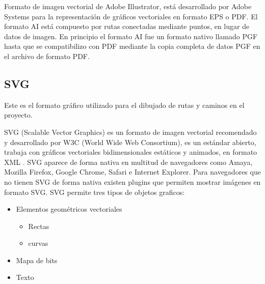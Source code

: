 Formato de imagen vectorial de Adobe Illustrator, está desarrollado por Adobe Systems para la representación de gráficos vectoriales en formato EPS o PDF. El formato AI está compuesto por rutas conectadas mediante puntos, en lugar de datos de imagen. 
En principio el formato AI fue un formato nativo llamado PGF hasta que se compatibilizo con PDF mediante la copia completa de datos PGF en el archivo de formato PDF.




\subsection{SVG}\label{svg}

\begin{flushleft}
Este es el formato gráfico utilizado para el dibujado de rutas y caminos en el proyecto.
\end{flushleft}

SVG (Scalable Vector Graphics) \cite{lasso_formatos_2015:a} es un formato de imagen vectorial recomendado y desarrollado por W3C (World Wide Web Consortium), es un estándar abierto, trabaja con gráficos vectoriales bidimensionales estáticos y animados, en formato XML \cite{noauthor_scalable_2017:a}.
SVG aparece de forma nativa en multitud de navegadores como Amaya, Mozilla Firefox, Google Chrome, Safari e Internet Explorer. Para navegadores que no tienen SVG de forma nativa existen plugins que permiten mostrar imágenes en formato SVG.
SVG permite tres tipos de objetos graficos:




\begin{itemize}
\item 
	Elementos geométricos vectoriales



\begin{itemize}
\item 
	Rectas 



\item 
	curvas
\end{itemize}


\item 
	Mapa de bits



\item 
	Texto



\end{itemize}


